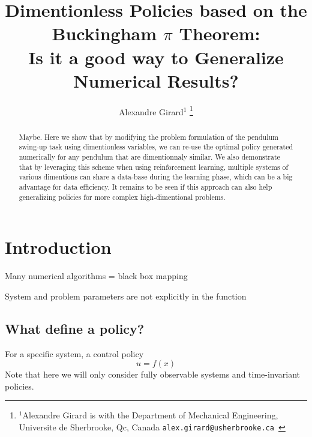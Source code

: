 

\title{\LARGE \bf
Dimentionless Policies based on the Buckingham $\pi$ Theorem: \\ 
Is it a good way to Generalize Numerical Results?
}


\author{Alexandre Girard$^{1}$%
\thanks{$^{1}$Alexandre Girard is with the Department of Mechanical Engineering, Universite de Sherbrooke, Qc, Canada {\tt\small  alex.girard@usherbrooke.ca }}%
}%


\maketitle
\thispagestyle{empty}
\pagestyle{empty}


\begin{abstract}
Maybe. Here we show that by modifying the problem formulation of the pendulum swing-up task using dimentionless variables, we can re-use the optimal policy generated numerically for any pendulum that are dimentionnaly similar. We also demonstrate that by leveraging this scheme when using reinforcement learning, multiple systems of various dimentions can share a data-base during the learning phase, which can be a big advantage for data efficiency. It remains to be seen if this approach can also help generalizing policies for more complex high-dimentional problems.
\end{abstract}

\section{Introduction}

Many numerical algorithms = black box mapping

System and problem parameters are not explicitly in the function




\subsection{What define a policy?}

For a specific system, a control policy 
\begin{equation}
u
=
f \left(
x
\right)
\end{equation}
Note that here we will only consider fully observable systems and time-invariant policies. 


